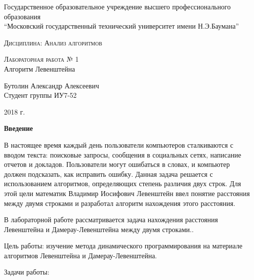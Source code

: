 \documentclass{article}
\begin{document}
	\begin{titlepage}
		\begin{center}
		\large
		Государственное образовательное учреждение высшего профессионального образования\\
		“Московский государственный технический университет имени Н.Э.Баумана”
		\vspace{0.25cm}
		
		
		\textsc{Дисциплина: Анализ алгоритмов}\\[5mm]
		\vfill
			
		\textsc{Лабораторная работа № 1}\\[5mm]
		
		{\LARGE Алгоритм Левенштейна}
		\bigskip
		
			
		Бутолин Александр Алексеевич\\
		Студент группы ИУ7-52
		\vfill		
		
		\end{center}
		\begin{center}
			2018 г.
		\end{center}
	\end{titlepage}

	

\begin{center}
	\textbf{Введение}
	\label{sec:intro}
\end{center}

В настоящее время каждый день пользователи компьютеров сталкиваются с вводом текста: поисковые запросы, сообщения в социальных сетях, написание отчетов и докладов. Пользователи могут ошибаться в словах, и компьютер должен подсказать, как исправить ошибку. Данная задача решается с использованием алгоритмов, определяющих степень различия двух строк. Для этой цели математик Владимир Иосифович Левенштейн ввел понятие расстояния между двумя строками и разработал алгоритм нахождения этого расстояния.

В лабораторной работе рассматривается задача нахождения расстояния Левенштейна и Дамерау-Левенштейна между двумя строками..

Цель работы: изучение метода динамического программирования на материале алгоритмов Левенштейна и Дамерау-Левенштейна.

Задачи работы:
\end{document}
